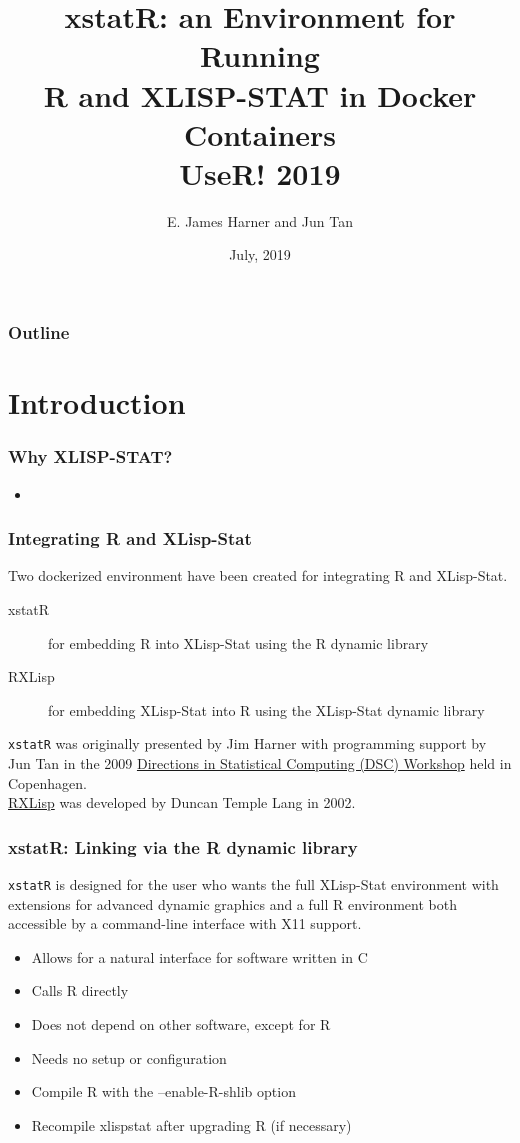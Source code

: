 \documentclass{beamer}
\title{xstatR: an Environment for Running\\ 
R and XLISP-STAT in Docker Containers\\  
UseR! 2019}
\author{E. James Harner and Jun Tan}
\institute[West Virginia University]{
  West Virginia University\\
  Rc$^2$ai
}
\date[]{July, 2019}
\begin{document}


\begin{frame}
  \titlepage
\end{frame}

\begin{frame}
  \frametitle{Outline}
  \tableofcontents
\end{frame}

\section{Introduction}

\begin{frame}
\frametitle{Why XLISP-STAT?}
\begin{itemize}
	\item 
\end{itemize}
\end{frame}

\begin{frame}
\frametitle{Integrating R and XLisp-Stat}

Two dockerized environment have been created for integrating R and XLisp-Stat.
\begin{description}
	\item[xstatR] for embedding R into XLisp-Stat using the R dynamic library
	\item[RXLisp] for embedding XLisp-Stat into R using the XLisp-Stat dynamic library
\end{description}
\vspace{0.5 cm}
\texttt{xstatR} was originally presented by Jim Harner with programming support by Jun Tan in the 2009 \href{https://www.r-project.org/DSC-2009/}{Directions in Statistical Computing (DSC) Workshop} held in Copenhagen.\\
\vspace{0.5 cm}
\href{http://www.omegahat.net/RXLisp/index.html}{RXLisp} was developed by Duncan Temple Lang in 2002.
\end{frame}

\begin{frame}
\frametitle{xstatR: Linking via the R dynamic library}

\texttt{xstatR} is designed for the user who wants the full XLisp-Stat environment with extensions for advanced dynamic graphics and a full R environment both accessible by a command-line interface with X11 support.

\begin{itemize}
	\item Allows for a natural interface for software written in C
	\item Calls R directly
	\item Does not depend on other software, except for R
	\item Needs no setup or configuration
	\item Compile R with the --enable-R-shlib option
	\item Recompile xlispstat after upgrading R (if necessary)
\end{itemize}
\end{frame}
\end{document}
